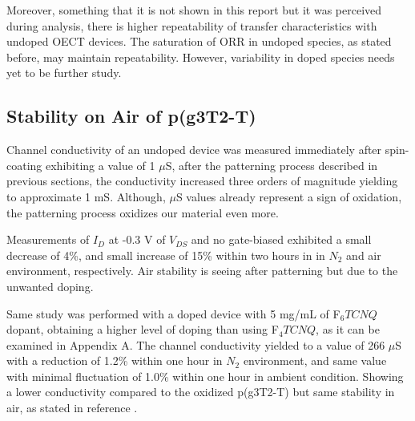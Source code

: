 Moreover, something that it is not shown in this report but it was perceived during analysis, there is higher repeatability of transfer characteristics with undoped OECT devices. The saturation of ORR in undoped species, as stated before, may maintain repeatability. However, variability in doped species needs yet to be further study. %

\subsection{Stability on Air of p(g3T2-T)}
Channel conductivity of an undoped device was measured immediately after spin-coating exhibiting a value of 1 $\mu$S, after the patterning process described in previous sections, the conductivity increased three orders of magnitude yielding to approximate 1 mS. Although, $\mu$S values already represent a sign of oxidation, the patterning process oxidizes our material even more. %

Measurements of $I_{D}$ at -0.3 V of $V_{DS}$ and no gate-biased exhibited a small decrease of 4\%, and small increase of 15\% within two hours in in $N_{2}$ and air environment, respectively. Air stability is seeing after patterning but due to the unwanted doping.

Same study was performed with a doped device with 5 mg/mL of F$_{6}TCNQ$ dopant, obtaining a higher level of doping than using F$_{4}TCNQ$, as it can be examined in Appendix A. The channel conductivity yielded to a value of 266 $\mu$S with a reduction of 1.2\% within one hour in $N_{2}$ environment, and same value with minimal fluctuation of 1.0\% within one hour in ambient condition. Showing a lower conductivity compared to the oxidized p(g3T2-T) but same stability in air, as stated in reference \cite{tanTuningOrganicElectrochemical2022}.

